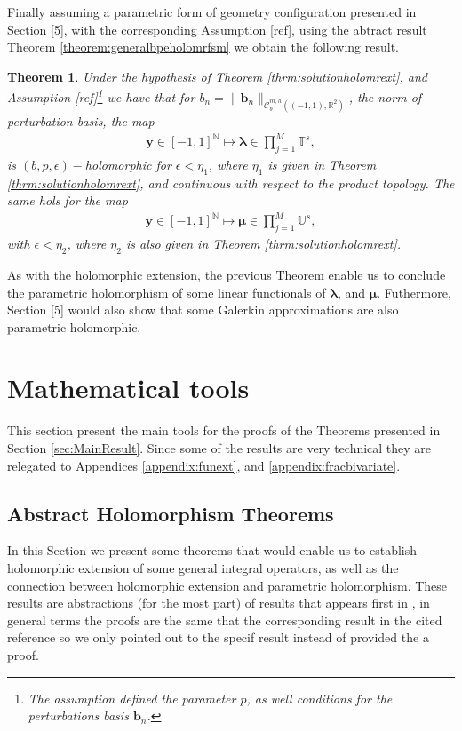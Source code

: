 \documentclass{article}
\newtheorem{theorem}{Theorem}[section]
\newcommand{\todo}[1]{{\color{red}[#1]}}
\newcommand{\bmu} {\bm{\mu}}
\newcommand{\IN}{{\mathbb N}}
\newcommand{\IR}{{\mathbb R}}
\newcommand{\IU}{{\mathbb U}}
\newcommand{\IT}{{\mathbb T}}
\newcommand{\rgeoh}[2]{\mathcal{C}_b^{#1,#2}\left( (-1,1), \IR^2 \right)}
\newcommand{\bla}{\boldsymbol \lambda}
\newcommand{\by}{\bm{y}}
\begin{document}
Finally assuming a parametric form of geometry configuration presented in Section \todo{5}, with the corresponding Assumption \todo{ref}, using the abtract result Theorem \ref{theorem:generalbpeholomrfsm} we obtain the following result. 

\begin{theorem}
Under the hypothesis of Theorem \ref{thrm:solutionholomrext}, and Assumption \todo{ref}\footnote{The assumption defined the parameter $p$, as well conditions for the perturbations basis $\mathbf{b}_n$.} we have that for $b_n = \|\mathbf{b}_n\|_{\rgeoh{m}{h}}$, the norm of perturbation basis, the map
\begin{align*}
\by \in [-1,1]^{\IN} \mapsto \bla \in \prod_{j=1}^M \IT^s,
\end{align*}
is $(b,p,\epsilon)-$holomorphic for $\epsilon < \eta_1$, where $\eta_1$ is given in Theorem \ref{thrm:solutionholomrext}, and continuous with respect to the product topology. The same hols for the map 
\begin{align*}
\by \in [-1,1]^{\IN} \mapsto \bmu \in \prod_{j=1}^M \IU^s,
\end{align*}
with $\epsilon < \eta_2$, where $\eta_2$ is also given in Theorem \ref{thrm:solutionholomrext}.
\end{theorem}
As with the holomorphic extension, the previous Theorem enable us to conclude the parametric holomorphism of some linear functionals of $\bla$, and $\bmu$. Futhermore, Section \todo{5} would also show that some Galerkin approximations are also parametric holomorphic. 
\section{Mathematical tools}
This section present the main tools for the proofs of the Theorems presented in Section \ref{sec:MainResult}. Since some of the results are very technical they are relegated to Appendices \ref{appendix:funext}, and \ref{appendix:fracbivariate}.

\subsection{Abstract Holomorphism Theorems}

In this Section we present some theorems that would enable us to establish holomorphic extension of some general integral operators, as well as the connection between holomorphic extension and parametric holomorphism. These results are abstractions (for the most part) of results that appears first in \cite{Henriquez2021}, in general terms the proofs are the same that the corresponding result in the cited reference so we only pointed out to the specif result instead of provided the a proof. 
\end{document}

